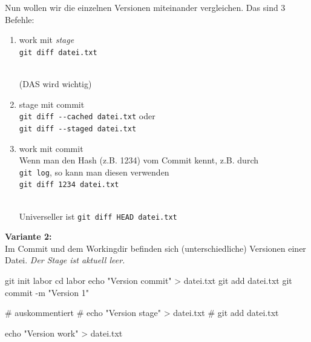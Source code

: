 \documentclass[
  letterpaper,
  DIV=11]{scrreprt}
\newenvironment{Shaded}{\begin{snugshade}}{\end{snugshade}}
\newcommand{\AttributeTok}[1]{\textcolor[rgb]{0.40,0.45,0.13}{#1}}
\newcommand{\BuiltInTok}[1]{\textcolor[rgb]{0.00,0.23,0.31}{#1}}
\newcommand{\CommentTok}[1]{\textcolor[rgb]{0.37,0.37,0.37}{#1}}
\newcommand{\FunctionTok}[1]{\textcolor[rgb]{0.28,0.35,0.67}{#1}}
\newcommand{\NormalTok}[1]{\textcolor[rgb]{0.00,0.23,0.31}{#1}}
\newcommand{\OperatorTok}[1]{\textcolor[rgb]{0.37,0.37,0.37}{#1}}
\newcommand{\StringTok}[1]{\textcolor[rgb]{0.13,0.47,0.30}{#1}}
\providecommand{\tightlist}{%
  \setlength{\itemsep}{0pt}\setlength{\parskip}{0pt}}\usepackage{longtable,booktabs,array}
\begin{document}
Nun wollen wir die einzelnen Versionen miteinander vergleichen. Das sind
3 Befehle:

\begin{enumerate}
\def\labelenumi{\arabic{enumi}.}
\tightlist
\item
  work mit \emph{stage}\\
  \texttt{git\ diff\ datei.txt}\strut \\
  (DAS wird wichtig)
\item
  stage mit commit\\
  \texttt{git\ diff\ -\/-cached\ datei.txt} oder\\
  \texttt{git\ diff\ -\/-staged\ datei.txt}
\item
  work mit commit\\
  Wenn man den Hash (z.B. 1234) vom Commit kennt, z.B. durch\\
  \texttt{git\ log}, so kann man diesen verwenden\\
  \texttt{git\ diff\ 1234\ datei.txt}\strut \\
  Universeller ist \texttt{git\ diff\ HEAD\ datei.txt}
\end{enumerate}

\textbf{Variante 2:}\\
Im Commit und dem Workingdir befinden sich (unterschiedliche) Versionen
einer Datei. \emph{Der Stage ist aktuell leer.}

\begin{Shaded}
\begin{Highlighting}[]
\FunctionTok{git}\NormalTok{ init labor}
\BuiltInTok{cd}\NormalTok{ labor }
\BuiltInTok{echo} \StringTok{"Version commit"} \OperatorTok{\textgreater{}}\NormalTok{ datei.txt }
\FunctionTok{git}\NormalTok{ add datei.txt }
\FunctionTok{git}\NormalTok{ commit }\AttributeTok{{-}m} \StringTok{"Version 1"}

\CommentTok{\# auskommentiert}
\CommentTok{\# echo "Version stage" \textgreater{} datei.txt }
\CommentTok{\# git add datei.txt }

\BuiltInTok{echo} \StringTok{"Version work"} \OperatorTok{\textgreater{}}\NormalTok{ datei.txt }
\end{Highlighting}
\end{Shaded}
\end{document}
